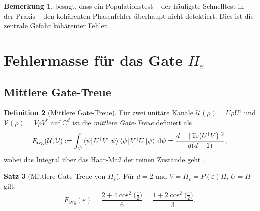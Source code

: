 ﻿\documentclass[11pt,a4paper]{article}
\theoremstyle{definition}
\newtheorem{theorem}{Satz}[section]
\newtheorem{definition}[theorem]{Definition}
\newtheorem{remark}[theorem]{Bemerkung}
\newcommand{\eps}{\varepsilon}
\newcommand{\Heps}{H_{\!\varepsilon}}
\newcommand{\Fav}{F_{\!\mathrm{avg}}}
\newcommand{\C}{\mathbb{C}}
\begin{document}
\begin{remark}
   besagt, dass ein Populationstest -- der häufigste
  Schnelltest in der Praxis -- den kohärenten Phasenfehler überhaupt nicht
  detektiert.  Dies ist die zentrale Gefahr kohärenter Fehler.
\end{remark}

\section{Fehlermasse für das Gate $\Heps$}
\label{sec:metrics}

\subsection{Mittlere Gate-Treue}
\label{subsec:avg_fidelity}

\begin{definition}[Mittlere Gate-Treue]
  Für zwei unitäre Kanäle $\mathcal{U}(\rho) = U\rho U^\dagger$ und
  $\mathcal{V}(\rho) = V\rho V^\dagger$ auf $\C^d$ ist die
  \emph{mittlere Gate-Treue} definiert als
  \begin{equation}
    F_{\!\mathrm{avg}}(\mathcal{U},\mathcal{V})
    := \int_{\psi} \bra{\psi}U^\dagger V \ket{\psi}\bra{\psi}V^\dagger U\ket{\psi}\,\mathrm{d}\psi
    = \frac{d + |\Tr(U^\dagger V)|^2}{d(d+1)},
    \label{eq:Favg_def}
  \end{equation}
  wobei das Integral über das Haar-Maß der reinen Zustände geht \cite{Nielsen2002}.
\end{definition}

\begin{theorem}[Mittlere Gate-Treue von $\Heps$]
\label{thm:favg}
  Für $d=2$ und $V = \Heps = P(\eps)H$, $U = H$ gilt:
  \begin{equation}
    \Fav(\eps) = \frac{2 + 4\cos^2\!\bigl(\tfrac{\eps}{2}\bigr)}{6}
    = \frac{1 + 2\cos^2\!\bigl(\tfrac{\eps}{2}\bigr)}{3}.
    \label{eq:Favg_result}
  \end{equation}
\end{theorem}
\end{document}
